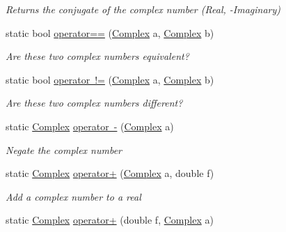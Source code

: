 \begin{DoxyCompactItemize}
\begin{DoxyCompactList}\small\item\em Returns the conjugate of the complex number (Real, -\/Imaginary) \end{DoxyCompactList}\item 
static bool \mbox{\hyperlink{struct_c_s_i_1_1_library_1_1_data_types_1_1_complex_a3fcb1f2dc062c2d039a2905cf322c7c3}{operator==}} (\mbox{\hyperlink{struct_c_s_i_1_1_library_1_1_data_types_1_1_complex}{Complex}} a, \mbox{\hyperlink{struct_c_s_i_1_1_library_1_1_data_types_1_1_complex}{Complex}} b)
\begin{DoxyCompactList}\small\item\em Are these two complex numbers equivalent? \end{DoxyCompactList}\item 
static bool \mbox{\hyperlink{struct_c_s_i_1_1_library_1_1_data_types_1_1_complex_af9069894fc1bd9228163257937953d3f}{operator !=}} (\mbox{\hyperlink{struct_c_s_i_1_1_library_1_1_data_types_1_1_complex}{Complex}} a, \mbox{\hyperlink{struct_c_s_i_1_1_library_1_1_data_types_1_1_complex}{Complex}} b)
\begin{DoxyCompactList}\small\item\em Are these two complex numbers different? \end{DoxyCompactList}\item 
static \mbox{\hyperlink{struct_c_s_i_1_1_library_1_1_data_types_1_1_complex}{Complex}} \mbox{\hyperlink{struct_c_s_i_1_1_library_1_1_data_types_1_1_complex_a30b7b337791642a2ac300121ba0bad0f}{operator -\/}} (\mbox{\hyperlink{struct_c_s_i_1_1_library_1_1_data_types_1_1_complex}{Complex}} a)
\begin{DoxyCompactList}\small\item\em Negate the complex number \end{DoxyCompactList}\item 
static \mbox{\hyperlink{struct_c_s_i_1_1_library_1_1_data_types_1_1_complex}{Complex}} \mbox{\hyperlink{struct_c_s_i_1_1_library_1_1_data_types_1_1_complex_a902ad0d7e47586efa28f30e40c8268e3}{operator+}} (\mbox{\hyperlink{struct_c_s_i_1_1_library_1_1_data_types_1_1_complex}{Complex}} a, double f)
\begin{DoxyCompactList}\small\item\em Add a complex number to a real \end{DoxyCompactList}\item 
static \mbox{\hyperlink{struct_c_s_i_1_1_library_1_1_data_types_1_1_complex}{Complex}} \mbox{\hyperlink{struct_c_s_i_1_1_library_1_1_data_types_1_1_complex_a1ba0b0b59df21c096c95b0f5228b5db7}{operator+}} (double f, \mbox{\hyperlink{struct_c_s_i_1_1_library_1_1_data_types_1_1_complex}{Complex}} a)

\end{DoxyCompactItemize}
